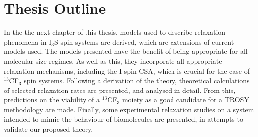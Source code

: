 \section{Thesis Outline}
In the the next chapter of this thesis, models used to describe relaxation phenomena in I$_3$S spin-systems are derived, which are extensions of current models used. The models presented have the benefit of being appropriate for all molecular size regimes. As well as this, they incorporate all appropriate relaxation mechanisms, including the I-spin CSA, which is crucial for the case of $^{13}$CF$_3$ spin systems. Following a derivation of the theory, theoretical calculations of selected relaxation rates are presented, and analysed in detail. From this, predictions on the viability of a $^{13}$CF$_3$ moiety as a good candidate for a TROSY methodology are made. Finally, some experimental relaxation studies on a system intended to mimic the behaviour of biomolecules are presented, in attempts to validate our proposed theory.
